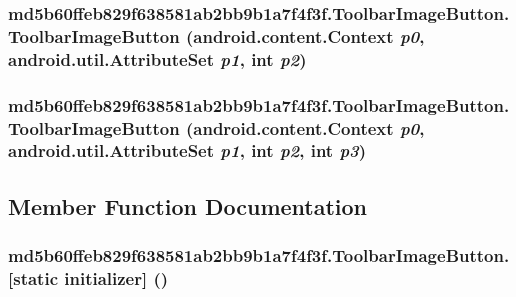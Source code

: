 \hypertarget{classmd5b60ffeb829f638581ab2bb9b1a7f4f3f_1_1_toolbar_image_button_ea3b6b5b763a9df42845f08ae1587edc}{
\subsubsection[{ToolbarImageButton}]{\setlength{\rightskip}{0pt plus 5cm}md5b60ffeb829f638581ab2bb9b1a7f4f3f.ToolbarImageButton.ToolbarImageButton (android.content.Context {\em p0}, \/  android.util.AttributeSet {\em p1}, \/  int {\em p2})}}
\label{classmd5b60ffeb829f638581ab2bb9b1a7f4f3f_1_1_toolbar_image_button_ea3b6b5b763a9df42845f08ae1587edc}


\hypertarget{classmd5b60ffeb829f638581ab2bb9b1a7f4f3f_1_1_toolbar_image_button_8927daf324fde7412a4fbef5898d7d91}{
\subsubsection[{ToolbarImageButton}]{\setlength{\rightskip}{0pt plus 5cm}md5b60ffeb829f638581ab2bb9b1a7f4f3f.ToolbarImageButton.ToolbarImageButton (android.content.Context {\em p0}, \/  android.util.AttributeSet {\em p1}, \/  int {\em p2}, \/  int {\em p3})}}
\label{classmd5b60ffeb829f638581ab2bb9b1a7f4f3f_1_1_toolbar_image_button_8927daf324fde7412a4fbef5898d7d91}




\subsection{Member Function Documentation}
\hypertarget{classmd5b60ffeb829f638581ab2bb9b1a7f4f3f_1_1_toolbar_image_button_28253b0846a1b912af0fe8c8aef8479a}{
\subsubsection[{[static initializer]}]{\setlength{\rightskip}{0pt plus 5cm}md5b60ffeb829f638581ab2bb9b1a7f4f3f.ToolbarImageButton.\mbox{[}static initializer\mbox{]} ()}}
\label{classmd5b60ffeb829f638581ab2bb9b1a7f4f3f_1_1_toolbar_image_button_28253b0846a1b912af0fe8c8aef8479a}


